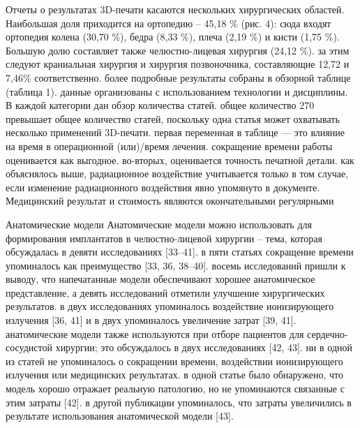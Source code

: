 Отчеты о результатах 3D-печати касаются нескольких хирургических областей.
Наибольшая доля приходится на ортопедию – 45,18 \% (рис. 4): сюда входят
ортопедия колена (30,70 \%), бедра (8,33 \%), плеча (2,19 \%) и кисти (1,75 \%). 
Большую долю составляет также челюстно-лицевая хирургия (24,12 \%). за этим 
следуют краниальная хирургия и хирургия позвоночника, составляющие 12,72 и
7,46\% соответственно. более подробные результаты собраны в обзорной таблице
(таблица 1). данные организованы с использованием технологии и дисциплины. В
каждой категории дан обзор количества статей. общее количество 270 превышает
общее количество статей, поскольку одна статья может охватывать несколько
применений 3D-печати. первая переменная в таблице — это влияние на время в
операционной (или)/время лечения. сокращение времени работы оценивается как
выгодное. во-вторых, оценивается точность печатной детали. как объяснялось выше,
радиационное воздействие учитывается только в том случае, если изменение
радиационного воздействия явно упомянуто в документе. Медицинский результат и
стоимость являются окончательными регулярными

Анатомические модели Анатомические модели можно использовать для формирования
имплантатов в челюстно-лицевой хирургии – тема, которая обсуждалась в девяти
исследованиях [33–41]. в пяти статьях сокращение времени упоминалось как
преимущество [33, 36, 38–40]. восемь исследований пришли к выводу, что
напечатанные модели обеспечивают хорошее анатомическое представление, а девять
исследований отметили улучшение хирургических результатов. в двух исследованиях
упоминалось воздействие ионизирующего излучения [36, 41] и в двух упоминалось
увеличение затрат [39, 41]. анатомические модели также используются при отборе
пациентов для сердечно-сосудистой хирургии; это обсуждалось в двух исследованиях
[42, 43]. ни в одной из статей не упоминалось о сокращении времени, воздействии
ионизирующего излучения или медицинских результатах. в одной статье было
обнаружено, что модель хорошо отражает реальную патологию, но не упоминаются
связанные с этим затраты [42]. в другой публикации упоминалось, что затраты
увеличились в результате использования анатомической модели [43].


